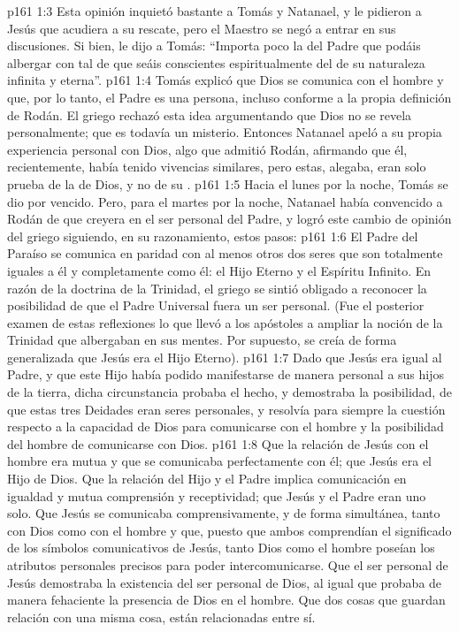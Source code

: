 \vs p161 1:3 Esta opinión inquietó bastante a Tomás y Natanael, y le pidieron a Jesús que acudiera a su rescate, pero el Maestro se negó a entrar en sus discusiones. Si bien, le dijo a Tomás: “Importa poco la  del Padre que podáis albergar con tal de que seáis conscientes espiritualmente del  de su naturaleza infinita y eterna”.
\vs p161 1:4 Tomás explicó que Dios se comunica con el hombre y que, por lo tanto, el Padre es una persona, incluso conforme a la propia definición de Rodán. El griego rechazó esta idea argumentando que Dios no se revela personalmente; que es todavía un misterio. Entonces Natanael apeló a su propia experiencia personal con Dios, algo que admitió Rodán, afirmando que él, recientemente, había tenido vivencias similares, pero estas, alegaba, eran solo prueba de la  de Dios, y no de su .
\vs p161 1:5 Hacia el lunes por la noche, Tomás se dio por vencido. Pero, para el martes por la noche, Natanael había convencido a Rodán de que creyera en el ser personal del Padre, y logró este cambio de opinión del griego siguiendo, en su razonamiento, estos pasos:
\vs p161 1:6 El Padre del Paraíso se comunica en paridad con al menos otros dos seres que son totalmente iguales a él y completamente como él: el Hijo Eterno y el Espíritu Infinito. En razón de la doctrina de la Trinidad, el griego se sintió obligado a reconocer la posibilidad de que el Padre Universal fuera un ser personal. (Fue el posterior examen de estas reflexiones lo que llevó a los apóstoles a ampliar la noción de la Trinidad que albergaban en sus mentes. Por supuesto, se creía de forma generalizada que Jesús era el Hijo Eterno).
\vs p161 1:7 Dado que Jesús era igual al Padre, y que este Hijo había podido manifestarse de manera personal a sus hijos de la tierra, dicha circunstancia probaba el hecho, y demostraba la posibilidad, de que estas tres Deidades eran seres personales, y resolvía para siempre la cuestión respecto a la capacidad de Dios para comunicarse con el hombre y la posibilidad del hombre de comunicarse con Dios.
\vs p161 1:8 Que la relación de Jesús con el hombre era mutua y que se comunicaba perfectamente con él; que Jesús era el Hijo de Dios. Que la relación del Hijo y el Padre implica comunicación en igualdad y mutua comprensión y receptividad; que Jesús y el Padre eran uno solo. Que Jesús se comunicaba comprensivamente, y de forma simultánea, tanto con Dios como con el hombre y que, puesto que ambos comprendían el significado de los símbolos comunicativos de Jesús, tanto Dios como el hombre poseían los atributos personales precisos para poder intercomunicarse. Que el ser personal de Jesús demostraba la existencia del ser personal de Dios, al igual que probaba de manera fehaciente la presencia de Dios en el hombre. Que dos cosas que guardan relación con una misma cosa, están relacionadas entre sí.
